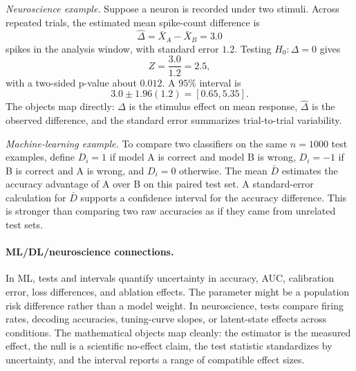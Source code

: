 \emph{Neuroscience example.}
Suppose a neuron is recorded under two stimuli. Across repeated trials, the estimated mean spike-count difference is
\[
\hat\Delta=\bar X_A-\bar X_B=3.0
\]
spikes in the analysis window, with standard error \(1.2\). Testing \(H_0:\Delta=0\) gives
\[
Z=\frac{3.0}{1.2}=2.5,
\]
with a two-sided p-value about \(0.012\). A \(95\%\) interval is
\[
3.0\pm1.96(1.2)=[0.65,5.35].
\]
The objects map directly: \(\Delta\) is the stimulus effect on mean response, \(\hat\Delta\) is the observed difference, and the standard error summarizes trial-to-trial variability.

\emph{Machine-learning example.}
To compare two classifiers on the same \(n=1000\) test examples, define \(D_i=1\) if model A is correct and model B is wrong, \(D_i=-1\) if B is correct and A is wrong, and \(D_i=0\) otherwise. The mean \(\bar D\) estimates the accuracy advantage of A over B on this paired test set. A standard-error calculation for \(\bar D\) supports a confidence interval for the accuracy difference. This is stronger than comparing two raw accuracies as if they came from unrelated test sets.

\paragraph{ML/DL/neuroscience connections.}
In ML, tests and intervals quantify uncertainty in accuracy, AUC, calibration error, loss differences, and ablation effects. The parameter might be a population risk difference rather than a model weight. In neuroscience, tests compare firing rates, decoding accuracies, tuning-curve slopes, or latent-state effects across conditions. The mathematical objects map cleanly: the estimator is the measured effect, the null is a scientific no-effect claim, the test statistic standardizes by uncertainty, and the interval reports a range of compatible effect sizes.

